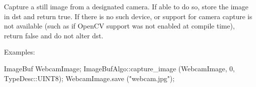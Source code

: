  
Capture a still image from a designated camera.  If able to do so,
store the image in {\cf dst} and return {\cf true}.  If there is no such device,
or support for camera capture is not available (such as if OpenCV
support was not enabled at compile time), return {\cf false} and do not
alter {\cf dst}.

\smallskip
\noindent Examples:
\begin{code}
    ImageBuf WebcamImage;
    ImageBufAlgo::capture_image (WebcamImage, 0, TypeDesc::UINT8);
    WebcamImage.save ("webcam.jpg");
\end{code}
\apiend

\chapwidthend
